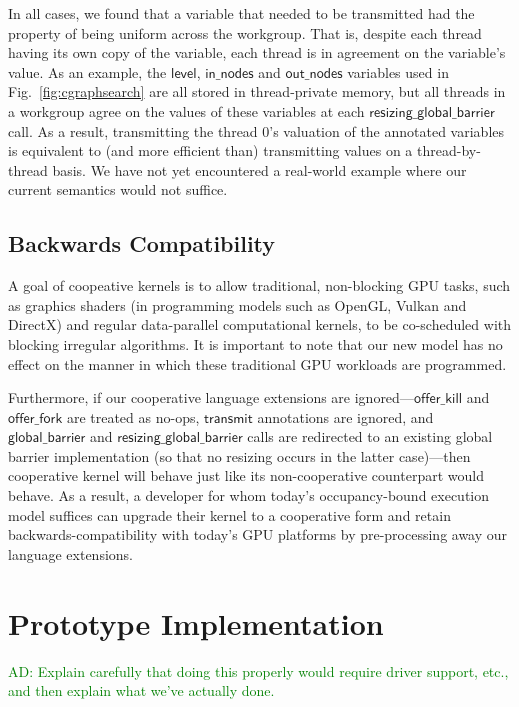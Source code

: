 \documentclass[numbers,nocopyrightspace,10pt]{sigplanconf}
\newcommand{\ADComment}[1]{\textcolor{green}{AD: #1}}
\newcommand{\myfig}{Fig.~}
\newcommand{\transmit}{\mathsf{transmit}}
\newcommand{\offerfork}{\mathsf{offer\_fork}}
\newcommand{\offerkill}{\mathsf{offer\_kill}}
\newcommand{\globalbarrier}{\mathsf{global\_barrier}}
\newcommand{\resizingglobalbarrier}{\mathsf{resizing\_global\_barrier}}
\newcommand{\keyword}[1]{\mathsf{#1}}
\begin{document}
In all cases, we found that a variable that needed to be transmitted
had the property of being uniform across the workgroup.  That is,
despite each thread having its own copy of the variable, each thread
is in agreement on the variable's value.  As an example, the
$\keyword{level}$, $\keyword{in\_nodes}$ and $\keyword{out\_nodes}$
variables used in \myfig\ref{fig:cgraphsearch} are all stored in thread-private
memory, but all threads in a workgroup agree on the values of these
variables at each $\resizingglobalbarrier$ call.  As a result,
transmitting the thread 0's valuation of the annotated variables is
equivalent to (and more efficient than) transmitting values on a
thread-by-thread basis.  We have not yet encountered a real-world
example where our current semantics would not suffice.



\subsection{Backwards Compatibility}\label{sec:backwardscompatibility}

A goal of coopeative kernels is to allow traditional, non-blocking GPU
tasks, such as graphics shaders (in programming models such as OpenGL,
Vulkan and DirectX) and regular data-parallel computational kernels,
to be co-scheduled with blocking irregular algorithms.  It is
important to note that our new model has no effect on the manner in
which these traditional GPU workloads are programmed.

Furthermore, if our cooperative language extensions are
ignored---$\offerkill$ and $\offerfork$ are treated as no-ops,
$\transmit$ annotations are ignored, and $\globalbarrier$ and
$\resizingglobalbarrier$ calls are redirected to an existing global
barrier implementation (so that no resizing occurs in the latter
case)---then cooperative kernel will behave just like its
non-cooperative counterpart would behave.  As a result, a developer
for whom today's occupancy-bound execution model suffices can upgrade
their kernel to a cooperative form and retain backwards-compatibility
with today's GPU platforms by pre-processing away our language
extensions.


\section{Prototype Implementation}\label{sec:implementation}

\ADComment{Explain carefully that doing this properly would require
  driver support, etc., and then explain what we've actually done.}
\end{document}
